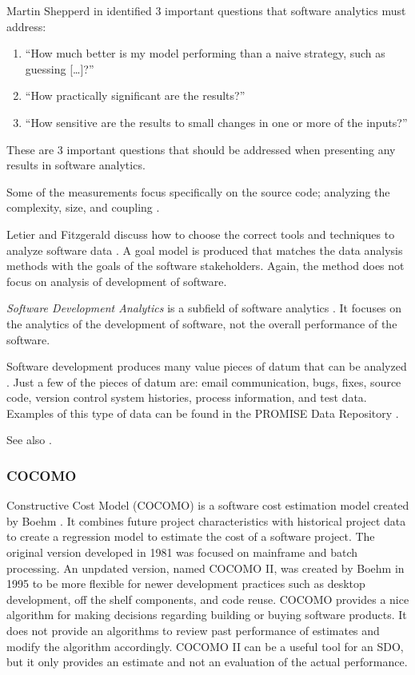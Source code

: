 \documentclass[SDSUThesis.tex]{subfiles}
\begin{document}
Martin Shepperd in \cite{Hassan2013} identified 3 important questions that software
analytics must address:
\begin{enumerate}
    \item ``How much better is my model performing than a naive strategy, such as guessing [\ldots]?''
    \item ``How practically significant are the results?''
    \item ``How sensitive are the results to small changes in one or more of the inputs?''
\end{enumerate}
These are 3 important questions that should be addressed when presenting any results in
software analytics.

Some of the measurements focus specifically on the source code; analyzing the 
complexity, size, and coupling \cite{Tosi2012}. 

Letier and Fitzgerald discuss how to choose the correct tools and techniques to analyze
software data \cite{Letier2013}.  A goal model is produced that matches the data analysis methods
with the goals of the software stakeholders.  Again, the method does not focus
on analysis of development of software.

\textit{Software Development Analytics} is a subfield of software analytics 
\cite{Menzies2012}.  It focuses on the analytics of the development of software, not
the overall performance of the software.  

Software development produces many value pieces of datum that can be analyzed
\cite{Marcus2010}. Just a few of the pieces of datum are:
email communication, bugs, fixes, source code, version control system histories,
process information, and test data.  Examples of this type of data
can be found in the PROMISE Data Repository \cite{promise12}.

See also \cite{Buse2010}.  



\subsubsection{COCOMO}  
    Constructive Cost Model (COCOMO) is a software cost estimation model created
    by Boehm \cite{Boehm1981}.  It combines future project characteristics
    with historical project data to create a regression model to estimate the 
    cost of a software project.  The original version developed in 1981 was
    focused on mainframe and batch processing.  An unpdated version, named
    COCOMO II, was created by Boehm in 1995 to be more flexible for newer 
    development practices such as desktop development, off the shelf components,
    and code reuse.  COCOMO provides a nice algorithm for making decisions
    regarding building or buying software products.  It does not provide 
    an algorithms to review past performance of estimates and modify the
    algorithm accordingly.  COCOMO II can be a useful tool for an SDO,
    but it only provides an estimate and not an evaluation of the actual
    performance.
\end{document}
